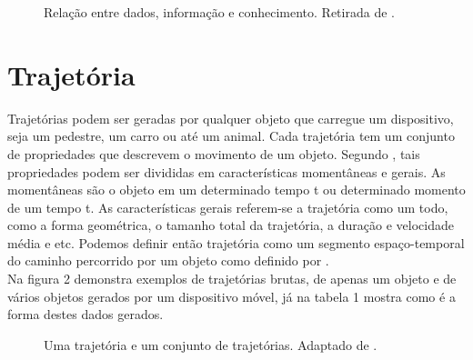 \documentclass[	12pt, Times, openright, twoside, a4paper, english, brazil]{abntex2}
\begin{document}
\begin{figure}[htb]
\caption{Relação entre dados, informação e conhecimento. Retirada de \cite{Rezende2003}.\label{fig:relação}}
\end{figure}

\section{Trajetória}
Trajetórias podem ser geradas por qualquer objeto que carregue um dispositivo, seja um pedestre, um carro ou até um animal. Cada trajetória tem um conjunto de propriedades que descrevem o movimento de um objeto. Segundo \cite{Giannotti2008}, tais propriedades podem ser divididas em características momentâneas e gerais. As momentâneas são o objeto em um determinado tempo t ou determinado momento de um tempo t. As características gerais referem-se a trajetória como um todo, como a forma geométrica, o tamanho total da trajetória, a duração e velocidade média e etc. Podemos definir então trajetória como um segmento espaço-temporal do caminho percorrido por um objeto como definido por \cite{Spaccapietra2008}.\\
\indent Na figura 2 demonstra exemplos de trajetórias brutas, de apenas um objeto e de vários objetos gerados por um dispositivo móvel, já na tabela 1 mostra como é a forma destes dados gerados.
\begin{figure}[!ht]
\caption{Uma trajetória e um conjunto de trajetórias. Adaptado de \cite{Giannotti2008}.\label{fig:trajetorias}}
\end{figure}
\end{document}
